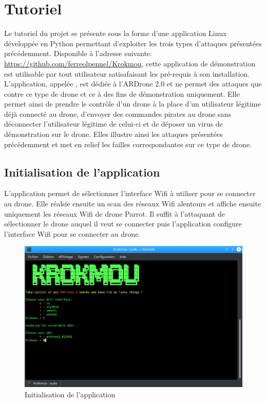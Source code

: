 \section{Tutoriel}
Le tutoriel du projet se présente sous la forme d'une application Linux développée en Python permettant d'exploiter les trois types d'attaques présentées précédemment. Disponible à l'adresse suivante: \url{https://github.com/ferreolpennel/Krokmou}, cette application de démonstration est utilisable par tout utilisateur satisafaisant les pré-requis à son installation. L'application, appelée , est dédiée à l'ARDrone 2.0 et ne permet des attaques que contre ce type de drone et ce à des fins de démonstration uniquement. Elle permet ainsi de prendre le contrôle d'un drone à la place d'un utilisateur légitime déjà connecté au drone, d'envoyer des commandes pirates au drone sans déconnecter l'utilisateur légitime de celui-ci et de déposer un virus de démonstration sur le drone. Elles illustre ainsi les attaques présentées précédemment et met en relief les failles correspondantes sur ce type de drone.

\subsection{Initialisation de l'application}
L'application permet de sélectionner l'interface Wifi à utiliser pour se connecter au drone. Elle réalsie ensuite un scan des réseaux Wifi alentours et affiche ensuite uniquement les réseaux Wifi de drone Parrot. Il suffit à l'attaquant de sélectionner le drone auquel il veut se connecter puis l'application configure l'interface Wifi pour se connecter au drone.

\begin{figure}[H]
  \centering
  \includegraphics[scale=0.3]{images/opening.png}
  \caption{Initialisation de l'application}
\end{figure}

